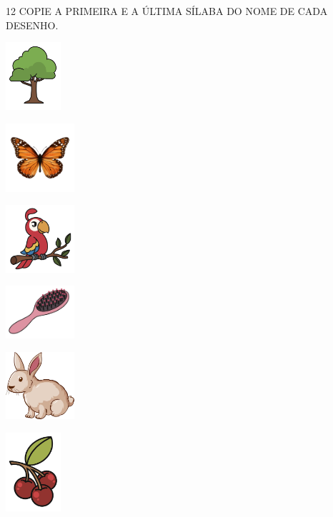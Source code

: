 \begin{center}
\begin{tabular}{ll}
\end{tabular}
\end{center}

\pagebreak

\num{12} COPIE A PRIMEIRA E A ÚLTIMA SÍLABA DO NOME DE CADA DESENHO.

\begin{escolha}
\item \includegraphics[width=0.8in]{media/image110.png}

\item \includegraphics[width=1in]{media/image111.jpg}

\item \includegraphics[width=1in]{media/image112.png}

\item \includegraphics[width=1in]{media/image75.png}

\item \includegraphics[width=1in]{media/image70.png}

\item \includegraphics[width=0.8in]{media/image103.png}
\end{escolha}


